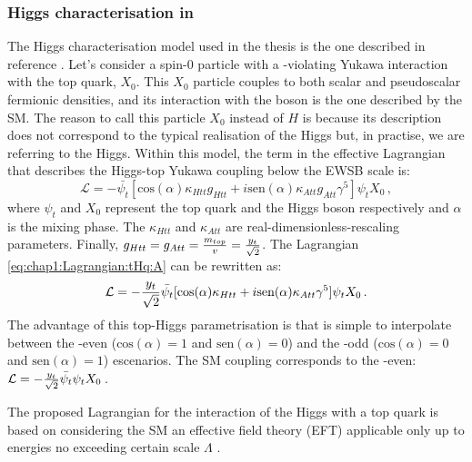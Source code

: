 \subsubsection{Higgs characterisation in \tH}
The Higgs characterisation model used in the thesis is the one described in reference \cite{Demartin:2015uha}.
Let's consider a spin-0 particle with a \CP-violating Yukawa interaction with the top quark, $X_0$.
This $X_0$ particle couples to both scalar and pseudoscalar fermionic densities, and its
interaction with the \PW boson is the one described by the SM. The reason to call this particle $X_0$
instead of $H$ is because its description does not correspond to the typical realisation of the Higgs
but, in practise, we are referring to the Higgs. Within this model, the term in the effective Lagrangian
that describes the Higgs-top Yukawa coupling below the EWSB scale is:
\begin{equation}
\label{eq:chap1:Lagrangian:tHq:A}
	\mathcal{L} = -\bar{\psi_{t}}[\text{cos}(\alpha)\kappa_{Htt} g_{Htt}  +  i \text{sen}(\alpha)\kappa_{Att} g_{Att} \gamma^{5}]\psi_{t}X_{0}\, ,
\end{equation}
where $\psi_{t}$ and $X_{0}$ represent the top quark and the Higgs boson respectively and $\alpha$ is the \CP mixing phase.
The $\kappa_{Htt}$ and $\kappa_{Att}$ are real-dimensionless-rescaling parameters. 
Finally, $g_{Htt} = g_{Att} = \frac{m_{top}}{v} = \frac{y_{t}}{\sqrt{2}}$. The Lagrangian \ref{eq:chap1:Lagrangian:tHq:A} can
be rewritten as:
\begin{equation}
\label{eq:chap1:Lagrangian:tHq:b}
	\mathcal{L} = -\frac{y_{t}}{\sqrt{2}}\bar{\psi_{t}}[\text{cos}(\alpha)\kappa_{Htt} +  i \text{sen}(\alpha)\kappa_{Att} \gamma^{5}]\psi_{t}X_{0}\, .
\end{equation}
The advantage of this top-Higgs parametrisation is that is simple to interpolate between
the \CP-even ($\text{cos}(\alpha) = 1$ and $\text{sen}(\alpha) = 0$) 
and the \CP-odd ($\text{cos}(\alpha) = 0$ and $\text{sen}(\alpha) = 1$) escenarios. 
The SM coupling corresponds to the \CP-even: $\mathcal{L} = -\frac{y_{t}}{\sqrt{2}} \bar{\psi_{t}} \psi_{t} X_{0} \,$.

The proposed Lagrangian for the interaction of the Higgs with a top quark is 
based on considering the SM an effective field theory (EFT) applicable only
up to energies no exceeding certain scale $\Lambda$ \cite{Grzadkowski:2010es}.

